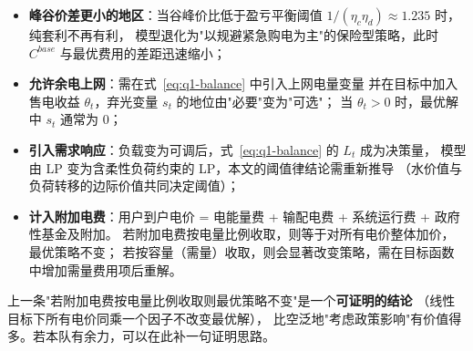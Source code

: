 \begin{itemize}
  \item \textbf{峰谷价差更小的地区}：当谷峰价比低于盈亏平衡阈值
        \(1/(\eta_c\eta_d)\approx1.235\) 时，纯套利不再有利，
        模型退化为"以规避紧急购电为主"的保险型策略，此时 \(C^{base}\) 与最优费用的差距迅速缩小；
  \item \textbf{允许余电上网}：需在式~\eqref{eq:q1-balance} 中引入上网电量变量
        并在目标中加入售电收益 \(\theta_t\)，弃光变量 \(s_t\) 的地位由"必要"变为"可选"；
        当 \(\theta_t>0\) 时，最优解中 \(s_t\) 通常为 0；
  \item \textbf{引入需求响应}：负载变为可调后，式~\eqref{eq:q1-balance} 的 \(L_t\) 成为决策量，
        模型由 LP 变为含柔性负荷约束的 LP，本文的阈值律结论需重新推导
        （水价值与负荷转移的边际价值共同决定阈值）；
  \item \textbf{计入附加电费}：用户到户电价 = 电能量费 + 输配电费 + 系统运行费 + 政府性基金及附加。
        若附加电费按电量比例收取，则等于对所有电价整体加价，最优策略不变；
        若按容量（需量）收取，则会显著改变策略，需在目标函数中增加需量费用项后重解。
\end{itemize}

\begin{guideblock}
上一条"若附加电费按电量比例收取则最优策略不变"是一个\textbf{可证明的结论}
（线性目标下所有电价同乘一个因子不改变最优解），
比空泛地"考虑政策影响"有价值得多。若本队有余力，可以在此补一句证明思路。
\end{guideblock}
